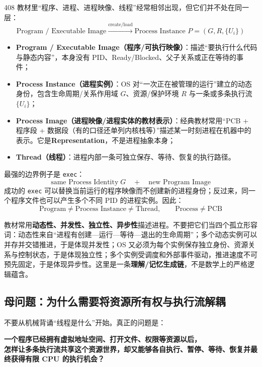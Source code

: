 \documentclass[11pt,a4paper]{ctexart}
\newcommand{\kw}[1]{\textbf{#1}}
\newcommand{\code}[1]{\texttt{#1}}
\begin{document}
408 教材里“程序、进程、进程映像、线程”经常相邻出现，但它们并不处在同一层：
\[
\boxed{
\text{Program / Executable Image}
\xrightarrow{\text{create/load}}
\text{Process Instance }P=(G,R,\{U_i\})
}
\]
\begin{itemize}
\item \kw{Program / Executable Image（程序/可执行映像）}：描述“要执行什么代码与静态内容”，本身没有 PID、Ready/Blocked、父子关系或正在等待的事件；
\item \kw{Process Instance（进程实例）}：OS 对“一次正在被管理的运行”建立的动态身份，包含生命周期/关系作用域 $G$、资源/保护环境 $R$ 与一条或多条执行流 $\{U_i\}$；
\item \kw{Process Image（进程映像/进程实体的教材表示）}：经典教材常用“PCB + 程序段 + 数据段（有的口径还单列内核栈等）”描述某一时刻进程在机器中的表示。它是\kw{Representation}，不是进程抽象本身；
\item \kw{Thread（线程）}：进程内部一条可独立保存、等待、恢复的执行路径。
\end{itemize}

最强的边界例子是 \code{exec}：
\[
\boxed{\text{same Process Identity}\;G\quad+\quad\text{new Program Image}}
\]
成功的 \code{exec} 可以替换当前运行的程序映像而不创建新的进程身份；反过来，同一个程序文件也可以产生多个不同 PID 的进程实例。因此：
\[
\boxed{\text{Program}\neq\text{Process Instance}\neq\text{Thread},\qquad \text{Process}\neq\text{PCB}}
\]

\begin{exam}
教材常用\kw{动态性、并发性、独立性、异步性}描述进程。不要把它们当四个孤立形容词：动态性来自“进程有创建—运行—等待—退出的生命周期”；多个动态实例可以并存并交错推进，于是体现并发性；OS 又必须为每个实例保存独立身份、资源关系与控制状态，于是体现独立性；多个实例受调度和外部事件驱动，推进速度不可预先固定，于是体现异步性。这里是一条\kw{理解/记忆生成链}，不是数学上的严格逻辑蕴含。
\end{exam}

\subsection{母问题：为什么需要将资源所有权与执行流解耦}

不要从机械背诵“线程是什么”开始。真正的问题是：

\begin{center}
\bfseries 一个程序已经拥有虚拟地址空间、打开文件、权限等资源以后，\\
怎样让多条执行流共享这个资源世界，却又能够各自执行、暂停、等待、恢复并最终获得有限 CPU 的执行机会？
\end{center}
\end{document}
